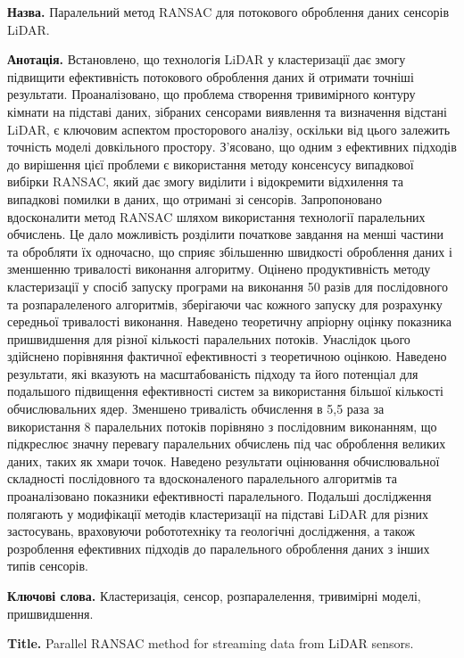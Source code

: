 \documentclass{article}
\begin{document}
\textbf{Назва.}
Паралельний метод RANSAC для потокового оброблення даних сенсорів LiDAR.

\textbf{Анотація.}
Встановлено, що технологія LiDAR у кластеризації дає змогу підвищити ефективність потокового оброблення даних й отримати точніші результати. Проаналізовано, що проблема створення тривимірного контуру кімнати на підставі даних, зібраних сенсорами виявлення та визначення відстані LiDAR, є ключовим аспектом просторового аналізу, оскільки від цього залежить точність моделі довкільного простору. З'ясовано, що одним з ефективних підходів до вирішення цієї проблеми є використання методу консенсусу випадкової вибірки RANSAC, який дає змогу виділити і відокремити відхилення та випадкові помилки в даних, що отримані зі сенсорів. Запропоновано вдосконалити метод RANSAC шляхом використання технології паралельних обчислень. Це дало можливість розділити початкове завдання на менші частини та обробляти їх одночасно, що сприяє збільшенню швидкості оброблення даних і зменшенню тривалості виконання алгоритму. Оцінено продуктивність методу кластеризації у спосіб запуску програми на виконання 50 разів для послідовного та розпаралеленого алгоритмів, зберігаючи час кожного запуску для розрахунку середньої тривалості виконання. Наведено теоретичну апріорну оцінку показника пришвидшення для різної кількості паралельних потоків. Унаслідок цього здійснено порівняння фактичної ефективності з теоретичною оцінкою. Наведено результати, які вказують на масштабованість підходу та його потенціал для подальшого підвищення ефективності систем за використання більшої кількості обчислювальних ядер. Зменшено тривалість обчислення в 5,5 раза за використання 8 паралельних потоків порівняно з послідовним виконанням, що підкреслює значну перевагу паралельних обчислень під час оброблення великих даних, таких як хмари точок. Наведено результати оцінювання обчислювальної складності послідовного та вдосконаленого паралельного алгоритмів та проаналізовано показники ефективності паралельного. Подальші дослідження полягають у модифікації методів кластеризації на підставі LiDAR для різних застосувань, враховуючи робототехніку та геологічні дослідження, а також розроблення ефективних підходів до паралельного оброблення даних з інших типів сенсорів.

\textbf{Ключові слова.}
Кластеризація, сенсор, розпаралелення, тривимірні моделі, пришвидшення.

\textbf{Title.}
Parallel RANSAC method for streaming data from LiDAR sensors.
\end{document}
